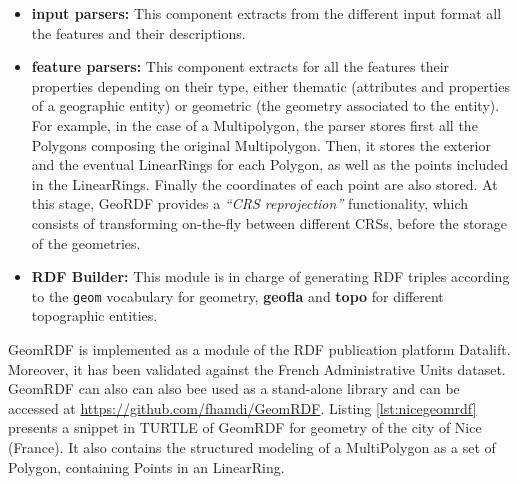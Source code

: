 \begin{itemize}
\item \textbf{input parsers:} This component extracts from the different input format all the features and their descriptions.
\item \textbf{feature parsers:} This component extracts for all the features their properties depending on their type, either thematic (attributes and properties of a geographic entity) or geometric (the geometry associated to the entity). For example, in the case of a Multipolygon, the parser stores first all the Polygons composing the original Multipolygon. Then, it stores the exterior and the eventual LinearRings for each Polygon, as well as the points included in the LinearRings. Finally the coordinates of each point are also stored. At this stage, GeoRDF provides a \textit{``CRS reprojection''} functionality, which consists of transforming on-the-fly between different CRSs, before the storage of the geometries.

\item  \textbf{RDF Builder:} This module is in charge of generating RDF triples according to the \texttt{geom} vocabulary for geometry, \textbf{geofla} and \textbf{topo} for different topographic entities.


\end{itemize}

GeomRDF is implemented as a module of the RDF publication platform Datalift. Moreover, it has been validated against the French Administrative Units dataset. GeomRDF can also can also bee used as a stand-alone library and can be accessed at \url{https://github.com/fhamdi/GeomRDF}. Listing \ref{lst:nicegeomrdf} presents a snippet in TURTLE of GeomRDF for geometry of the city of Nice (France). It also contains the structured modeling of a MultiPolygon as a set of Polygon, containing Points in an LinearRing.



